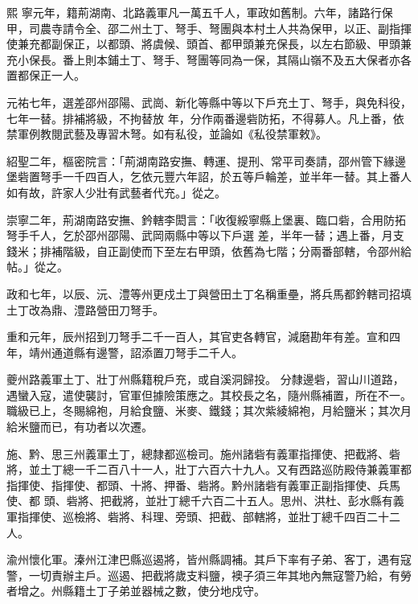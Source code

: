 \begin{pinyinscope}
 熙
 寧元年，籍荊湖南、北路義軍凡一萬五千人，軍政如舊制。六年，諸路行保甲，司農寺請令全、邵二州土丁、弩手、弩團與本村土人共為保甲，以正、副指揮使兼充都副保正，以都頭、將虞候、頭首、都甲頭兼充保長，以左右節級、甲頭兼充小保長。番上則本鋪土丁、弩手、弩團等同為一保，其隔山嶺不及五大保者亦各置都保正一人。



 元祐七年，選差邵州邵陽、武崗、新化等縣中等以下戶充土丁、弩手，與免科役，七年一替。排補將級，不拘替放
 年，分作兩番邊砦防拓，不得募人。凡上番，依禁軍例教閱武藝及專習木弩。如有私役，並論如《私役禁軍敕》。



 紹聖二年，樞密院言：「荊湖南路安撫、轉運、提刑、常平司奏請，邵州管下緣邊堡砦置弩手一千四百人，乞依元豐六年詔，於五等戶輪差，並半年一替。其上番人如有故，許家人少壯有武藝者代充。」從之。



 崇寧二年，荊湖南路安撫、鈐轄李閎言：「收復綏寧縣上堡裏、臨口砦，合用防拓弩手千人，乞於邵州邵陽、武岡兩縣中等以下戶選
 差，半年一替；遇上番，月支錢米；排補階級，自正副使而下至左右甲頭，依舊為七階；分兩番部轄，令邵州給帖。」從之。



 政和七年，以辰、沅、澧等州更戍土丁與營田土丁名稱重壘，將兵馬都鈐轄司招填土丁改為鼎、澧路營田刀弩手。



 重和元年，辰州招到刀弩手二千一百人，其官吏各轉官，減磨勘年有差。宣和四年，靖州通道縣有邊警，詔添置刀弩手二千人。



 夔州路義軍土丁、壯丁州縣籍稅戶充，或自溪洞歸投。
 分隸邊砦，習山川道路，遇蠻入寇，遣使襲討，官軍但據險策應之。其校長之名，隨州縣補置，所在不一。職級已上，冬賜綿袍，月給食鹽、米麥、鐵錢；其次紫綾綿袍，月給鹽米；其次月給米鹽而已，有功者以次遷。



 施、黔、思三州義軍土丁，總隸都巡檢司。施州諸砦有義軍指揮使、把截將、砦將，並土丁總一千二百八十一人，壯丁六百六十九人。又有西路巡防殿侍兼義軍都指揮使、指揮使、都頭、十將、押番、砦將。黔州諸砦有義軍正副指揮使、兵馬使、都
 頭、砦將、把截將，並壯丁總千六百二十五人。思州、洪杜、彭水縣有義軍指揮使、巡檢將、砦將、科理、旁頭、把截、部轄將，並壯丁總千四百二十二人。



 渝州懷化軍。溱州江津巴縣巡遏將，皆州縣調補。其戶下率有子弟、客丁，遇有寇警，一切責辦主戶。巡遏、把截將歲支料鹽，襖子須三年其地內無寇警乃給，有勞者增之。州縣籍土丁子弟並器械之數，使分地戍守。




\end{pinyinscope}
